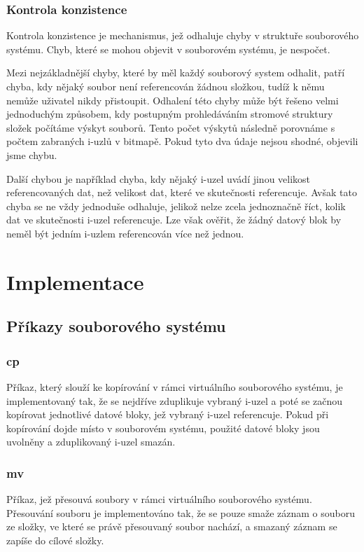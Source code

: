 \documentclass[12pt, a4paper]{article}
\let\oldsection\section
\renewcommand\section{\clearpage\oldsection}
\begin{document}
	\subsubsection{Kontrola konzistence}
	Kontrola konzistence je mechanismus, jež odhaluje chyby v struktuře souborového systému. Chyb, které se mohou objevit v souborovém systému, je nespočet.
	 
	 Mezi nejzákladnější chyby, které by měl každý souborový system odhalit, patří chyba, kdy nějaký soubor není referencován žádnou složkou, tudíž k němu nemůže uživatel nikdy přistoupit. Odhalení této chyby může být řešeno velmi jednoduchým způsobem, kdy postupným prohledáváním stromové struktury složek počítáme výskyt souborů. Tento počet výskytů následně porovnáme s počtem zabraných i-uzlů v bitmapě. Pokud tyto dva údaje nejsou shodné, objevili jsme chybu.
	
		Další chybou je například chyba, kdy nějaký i-uzel uvádí jinou velikost referencovaných dat, než velikost dat, které ve skutečnosti referencuje. Avšak tato chyba se ne vždy jednoduše odhaluje, jelikož nelze zcela jednoznačně říct, kolik dat ve skutečnosti i-uzel referencuje. Lze však ověřit, že žádný datový blok by neměl být jedním i-uzlem referencován více než jednou. 
	
	

    \section{Implementace}
    
    	\subsection{Příkazy souborového systému}
		
		\subsubsection{cp}
		Příkaz, který slouží ke kopírování v rámci virtuálního souborového systému, je implementovaný tak, že se nejdříve zduplikuje vybraný i-uzel a poté se začnou kopírovat jednotlivé datové bloky, jež vybraný i-uzel referencuje. Pokud při kopírování dojde místo v souborovém systému, použité datové bloky jsou uvolněny a zduplikovaný i-uzel smazán.
		
		\subsubsection{mv}
		Příkaz, jež přesouvá soubory v rámci virtuálního souborového systému. Přesouvání souboru je implementováno tak, že se pouze smaže záznam o souboru ze složky, ve které se právě přesouvaný soubor nachází, a smazaný záznam se zapíše do cílové složky.
		
\end{document}
